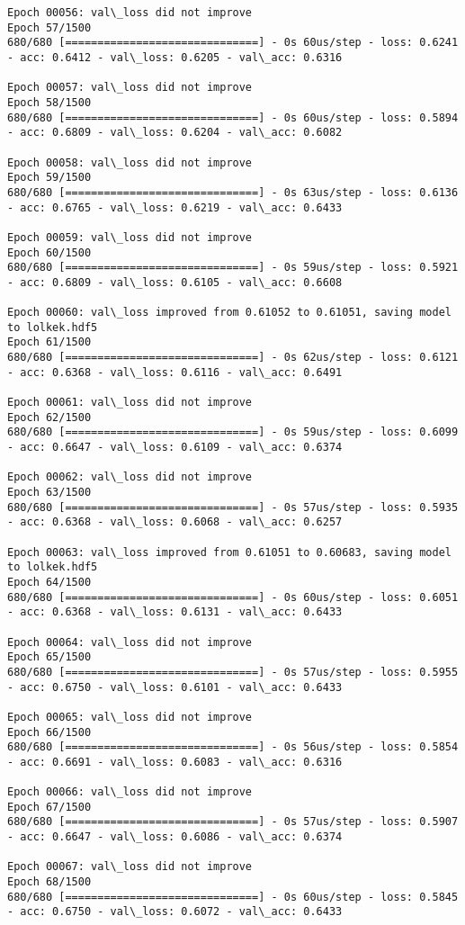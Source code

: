 \documentclass[11pt]{article}
\begin{document}
\begin{Verbatim}[commandchars=\\\{\}]
Epoch 00056: val\_loss did not improve
Epoch 57/1500
680/680 [==============================] - 0s 60us/step - loss: 0.6241 - acc: 0.6412 - val\_loss: 0.6205 - val\_acc: 0.6316

Epoch 00057: val\_loss did not improve
Epoch 58/1500
680/680 [==============================] - 0s 60us/step - loss: 0.5894 - acc: 0.6809 - val\_loss: 0.6204 - val\_acc: 0.6082

Epoch 00058: val\_loss did not improve
Epoch 59/1500
680/680 [==============================] - 0s 63us/step - loss: 0.6136 - acc: 0.6765 - val\_loss: 0.6219 - val\_acc: 0.6433

Epoch 00059: val\_loss did not improve
Epoch 60/1500
680/680 [==============================] - 0s 59us/step - loss: 0.5921 - acc: 0.6809 - val\_loss: 0.6105 - val\_acc: 0.6608

Epoch 00060: val\_loss improved from 0.61052 to 0.61051, saving model to lolkek.hdf5
Epoch 61/1500
680/680 [==============================] - 0s 62us/step - loss: 0.6121 - acc: 0.6368 - val\_loss: 0.6116 - val\_acc: 0.6491

Epoch 00061: val\_loss did not improve
Epoch 62/1500
680/680 [==============================] - 0s 59us/step - loss: 0.6099 - acc: 0.6647 - val\_loss: 0.6109 - val\_acc: 0.6374

Epoch 00062: val\_loss did not improve
Epoch 63/1500
680/680 [==============================] - 0s 57us/step - loss: 0.5935 - acc: 0.6368 - val\_loss: 0.6068 - val\_acc: 0.6257

Epoch 00063: val\_loss improved from 0.61051 to 0.60683, saving model to lolkek.hdf5
Epoch 64/1500
680/680 [==============================] - 0s 60us/step - loss: 0.6051 - acc: 0.6368 - val\_loss: 0.6131 - val\_acc: 0.6433

Epoch 00064: val\_loss did not improve
Epoch 65/1500
680/680 [==============================] - 0s 57us/step - loss: 0.5955 - acc: 0.6750 - val\_loss: 0.6101 - val\_acc: 0.6433

Epoch 00065: val\_loss did not improve
Epoch 66/1500
680/680 [==============================] - 0s 56us/step - loss: 0.5854 - acc: 0.6691 - val\_loss: 0.6083 - val\_acc: 0.6316

Epoch 00066: val\_loss did not improve
Epoch 67/1500
680/680 [==============================] - 0s 57us/step - loss: 0.5907 - acc: 0.6647 - val\_loss: 0.6086 - val\_acc: 0.6374

Epoch 00067: val\_loss did not improve
Epoch 68/1500
680/680 [==============================] - 0s 60us/step - loss: 0.5845 - acc: 0.6750 - val\_loss: 0.6072 - val\_acc: 0.6433


\end{Verbatim}
\end{document}
